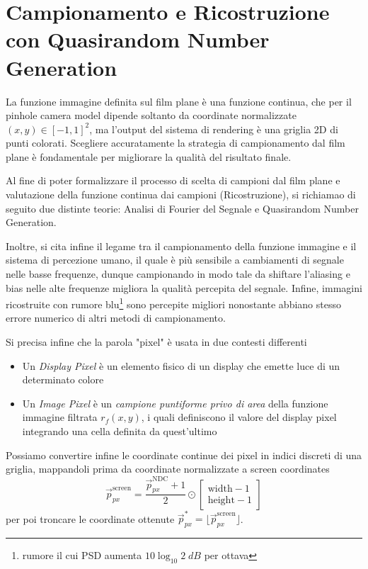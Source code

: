 \newcommand{\fourier}[1]{\ensuremath{\mathcal{F}\left\{#1\right\}}}
\newcommand{\ifourier}[1]{\ensuremath{\mathcal{F}^{-1}\left\{#1\right\}}}
\newcommand{\intwhole}{\ensuremath{\int_{-\infty}^{+\infty}}}
\newcommand{\sumwhole}[1]{\ensuremath{\sum_{#1=-\infty}^{+\infty}}}
\chapter{Campionamento e Ricostruzione con Quasirandom Number Generation}\label{chapter5}
La funzione immagine definita sul film plane \`e una funzione continua, che per il pinhole camera model dipende soltanto da coordinate normalizzate 
\mbox{$(x,y)\in[-1,1]^2$}, ma l'output del sistema di rendering \`e una griglia 2D di punti colorati. Scegliere accuratamente la strategia di 
campionamento dal film plane \`e fondamentale per migliorare la qualit\`a del risultato finale.\par
Al fine di poter formalizzare il processo di scelta di campioni dal film plane e valutazione della funzione continua dai campioni (Ricostruzione),
si richiamao di seguito due distinte teorie: Analisi di Fourier del Segnale e Quasirandom Number Generation.\par
Inoltre, si cita infine il legame tra il campionamento della funzione immagine e il sistema di percezione umano, il quale \`e pi\`u sensibile a 
cambiamenti di segnale nelle basse frequenze, dunque campionando in modo tale da shiftare l'aliasing e bias nelle alte frequenze migliora la 
qualit\`a percepita del segnale. Infine, immagini ricostruite con rumore blu\footnote{rumore il cui PSD aumenta $10\log_{10}2\;\si{dB}$ per ottava} 
sono percepite migliori nonostante abbiano stesso errore numerico di altri metodi di campionamento.\par
Si precisa infine che la parola "pixel" \`e usata in due contesti differenti
\begin{itemize}[topsep=0pt,noitemsep]
	\item[] Un \textit{Display Pixel} \`e un elemento fisico di un display che emette luce di un determinato colore
	\item[] Un \textit{Image Pixel} \`e un \textit{campione puntiforme privo di area} della funzione immagine filtrata $r_f(x,y)$, i quali 
		definiscono il valore del display pixel integrando una cella definita da quest'ultimo
\end{itemize}
Possiamo convertire infine le coordinate continue dei pixel in indici discreti di una griglia, mappandoli prima da coordinate normalizzate a 
screen coordinates
\begin{equation*}
	\vec{p}_{px}^{\mathrm{screen}}=\frac{\vec{p}_{px}^{\mathrm{NDC}}+1}{2}\odot
	\begin{bmatrix}
		\mathrm{width}-1 \\ \mathrm{height}-1
	\end{bmatrix}
\end{equation*}
per poi troncare le coordinate ottenute $\vec{p}_{px}^*=\lfloor\vec{p}_{px}^{\mathrm{screen}}\rfloor$.
